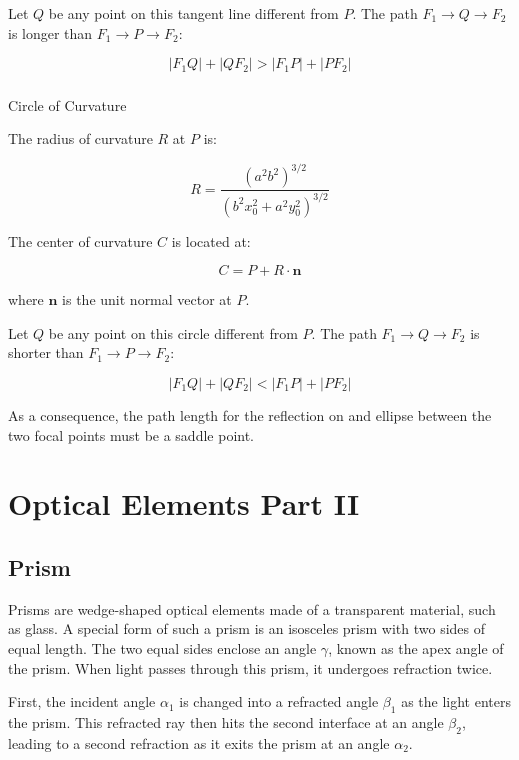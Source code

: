 \documentclass[
  a4paper,
]{book}
\makeatletter
\let\oldparagraph\paragraph
\renewcommand{\paragraph}{
    \@ifstar
      \xxxParagraphStar
      \xxxParagraphNoStar
  }
\newcommand{\xxxParagraphStar}[1]{\oldparagraph*{#1}\mbox{}}
\newcommand{\xxxParagraphNoStar}[1]{\oldparagraph{#1}\mbox{}}
\makeatother
\begin{document}
\begin{tcolorbox}
Let \(Q\) be any point on this tangent line different from \(P\). The
path \(F_1 \to Q \to F_2\) is longer than \(F_1 \to P \to F_2\):

\[|F_1Q| + |QF_2| > |F_1P| + |PF_2|\]

\paragraph{Circle of Curvature}\label{circle-of-curvature}

The radius of curvature \(R\) at \(P\) is:

\[R = \frac{(a^2b^2)^{3/2}}{(b^2x_0^2 + a^2y_0^2)^{3/2}}\]

The center of curvature \(C\) is located at:

\[C = P + R\cdot\mathbf{n}\]

where \(\mathbf{n}\) is the unit normal vector at \(P\).

Let \(Q\) be any point on this circle different from \(P\). The path
\(F_1 \to Q \to F_2\) is shorter than \(F_1 \to P \to F_2\):

\[|F_1Q| + |QF_2| < |F_1P| + |PF_2|\]

As a consequence, the path length for the reflection on and ellipse
between the two focal points must be a saddle point.

\end{tcolorbox}

\chapter{Optical Elements Part II}\label{optical-elements-part-ii}

\section{Prism}\label{prism}

Prisms are wedge-shaped optical elements made of a transparent material,
such as glass. A special form of such a prism is an isosceles prism with
two sides of equal length. The two equal sides enclose an angle
\(\gamma\), known as the apex angle of the prism. When light passes
through this prism, it undergoes refraction twice.

First, the incident angle \(\alpha_1\) is changed into a refracted angle
\(\beta_1\) as the light enters the prism. This refracted ray then hits
the second interface at an angle \(\beta_2\), leading to a second
refraction as it exits the prism at an angle \(\alpha_2\).
\end{document}
